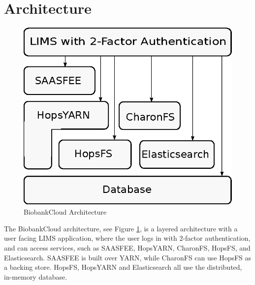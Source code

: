 \section{Architecture}

 \begin{figure}[h]
 \centering
 \includegraphics[scale=0.75]{./imgs/stack.eps}
 \caption{BiobankCloud Architecture}
 \label{fig:arch}
\end{figure}
The BiobankCloud architecture, see Figure \ref{fig:arch}, is a layered architecture with a user facing LIMS application, where the user logs in with 2-factor authentication, and can access services, such as SAASFEE, HopsYARN, CharonFS, HopsFS, and Elasticsearch. SAASFEE is built over YARN, while CharonFS can use HopsFS as a backing store. HopsFS, HopsYARN and Elasticsearch all use the distributed, in-memory database.

